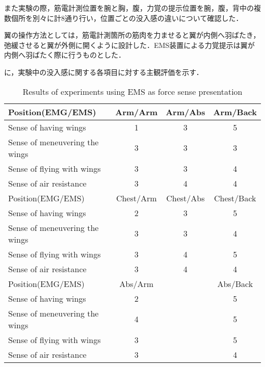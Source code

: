         また実験の際，筋電計測位置を腕と胸，腹，力覚の提示位置を腕，腹，背中の複数個所を別々に計8通り行い，位置ごとの没入感の違いについて確認した．

        翼の操作方法としては，筋電計測箇所の筋肉を力ませると翼が内側へ羽ばたき，弛緩させると翼が外側に開くように設計した．EMS装置による力覚提示は翼が内側へ羽ばたく際に行うものとした．


        に，実験中の没入感に関する各項目に対する主観評価を示す．
        
        \begin{table}[t]
            \begin{center}
                \caption{Results of experiments using EMS as force sense presentation}
                \scalebox{0.75}
                {
                    \begin{tabular}{l|c|c|c}
                        \hline
                        Position(EMG/EMS) & Arm/Arm & Arm/Abs & Arm/Back \\\hline
                        Sense of having wings & 1 & 3 & 5 \\
                        Sense of meneuvering the wings & 3 & 3 & 3\\
                        Sense of flying with wings & 3 & 3 & 4 \\
                        Sense of air resistance & 3 & 4 & 4 \\\hline\hline

                        Position(EMG/EMS) & Chest/Arm & Chest/Abs & Chest/Back \\\hline
                        Sense of having wings & 2 & 3 & 5 \\
                        Sense of meneuvering the wings & 3& 3 & 4\\
                        Sense of flying with wings & 3 & 4 & 5 \\                        
                        Sense of air resistance & 3 & 4 & 4 \\\hline\hline

                        Position(EMG/EMS) & Abs/Arm & & Abs/Back  \\\hline                        
                        Sense of having wings & 2 && 5 \\                        
                        Sense of meneuvering the wings & 4 && 5 \\
                        Sense of flying with wings & 3 && 5 \\
                        Sense of air resistance & 3 && 4\\\hline\hline
                    \end{tabular}
                }
            \end{center}
        \end{table}
        
